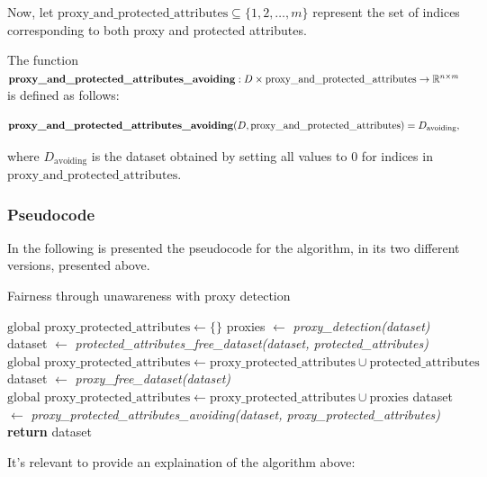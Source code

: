 \documentclass[12pt,a4paper,openright,twoside]{book}
\begin{document}
Now, let $\text{proxy\_and\_protected\_attributes} \subseteq \{1, 2, \ldots, m\}$ represent the set of indices corresponding to both proxy and protected attributes.

The function $\text{\textbf{proxy\_and\_protected\_attributes\_avoiding}}: D \times \text{proxy\_and\_protected\_attributes} \rightarrow \mathbb{R}^{n \times m}$ is defined as follows:

\[
\text{\textbf{proxy\_and\_protected\_attributes\_avoiding}}(D, \text{proxy\_and\_protected\_attributes}) = D_{\text{avoiding}},
\]

where $D_{\text{avoiding}}$ is the dataset obtained by setting all values to 0 for indices in $\text{proxy\_and\_protected\_attributes}$.


\subsubsection{Pseudocode}

In the following is presented the pseudocode for the algorithm, in its two different versions, presented above.

\begin{algorithm}[H]
    \caption{Fairness through unawareness with proxy detection}
    \label{alg:fairness_algorithm}
    \begin{algorithmic}[1]
        \State $\text{global } \text{proxy\_protected\_attributes} \gets \{\}$
            \State proxies $\gets$ \textit{proxy\_detection(dataset)}\;
                \State dataset $\gets$ \textit{protected\_attributes\_free\_dataset(dataset, protected\_attributes)}\;
                \State $\text{global } \text{proxy\_protected\_attributes} \gets \text{proxy\_protected\_attributes} \cup \text{protected\_attributes}$ 
            \Else
                \State dataset $\gets$ \textit{proxy\_free\_dataset(dataset)}\;
                \State $\text{global } \text{proxy\_protected\_attributes} \gets \text{proxy\_protected\_attributes} \cup \text{proxies}$
            \EndIf
        \EndWhile
        \State dataset $\gets$ \textit{proxy\_protected\_attributes\_avoiding(dataset, proxy\_protected\_attributes)}
        \State \textbf{return} dataset
    \end{algorithmic}
\end{algorithm}

It's relevant to provide an explaination of the algorithm above:
\end{document}
